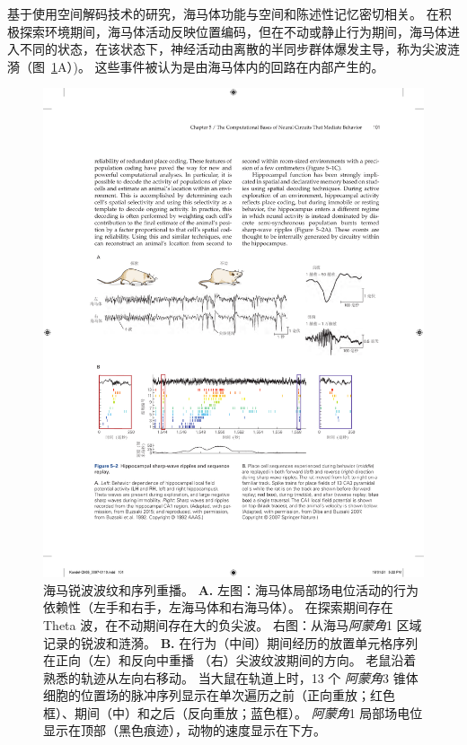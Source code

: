 基于使用空间解码技术的研究，海马体功能与空间和陈述性记忆密切相关。
在积极探索环境期间，海马体活动反映位置编码，但在不动或静止行为期间，海马体进入不同的状态，在该状态下，神经活动由离散的半同步群体爆发主导，称为尖波涟漪（图~\ref{fig:5_2}A）)。
这些事件被认为是由海马体内的回路在内部产生的。


\begin{figure}[htbp]
	\centering
	\includegraphics[width=1.0\linewidth]{chap05/fig_5_2}
	\caption{海马锐波波纹和序列重播。 
		\textbf{A.} 左图：海马体局部场电位活动的行为依赖性（左手和右手，左海马体和右海马体）。 
		在探索期间存在 Theta 波，在不动期间存在大的负尖波。 
		右图：从海马\textit{阿蒙角}1 区域记录的锐波和涟漪\cite{buzsaki2015hippocampal,buzsaki1992high}。
		\textbf{B.} 在行为（中间）期间经历的放置单元格序列在正向（左）和反向中重播 （右）尖波纹波期间的方向。 
		老鼠沿着熟悉的轨迹从左向右移动。 
		当大鼠在轨道上时，13 个 \textit{阿蒙角}3 锥体细胞的位置场的脉冲序列显示在单次遍历之前（正向重放；红色框）、期间（中）和之后（反向重放；蓝色框）。
		\textit{阿蒙角}1 局部场电位显示在顶部（黑色痕迹），动物的速度显示在下方\cite{diba2007forward}。}
	\label{fig:5_2}
\end{figure}


